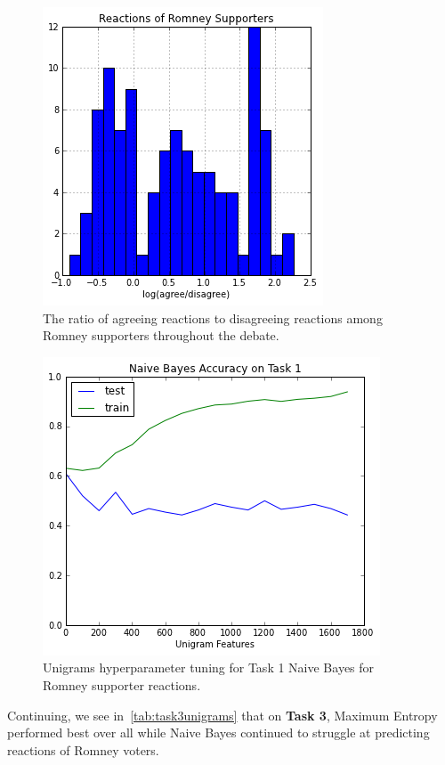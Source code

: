 \begin{figure}[]
	\centering
	\includegraphics[scale=0.60]{Figures/ngrams_balance_rom.png}
	\caption{The ratio of agreeing reactions to disagreeing reactions among Romney supporters throughout the debate.}
	\label{fig:ngramsbalancerom}
\end{figure}

\begin{figure}[]
	\centering
	\includegraphics[scale=0.60]{Figures/ngrams_hyperparam_task2_rom.png}
	\caption{Unigrams hyperparameter tuning for Task 1 Naive Bayes for Romney supporter reactions.}
	\label{fig:ngramstask2hyperparamrom}
\end{figure}

Continuing, we see in~\ref{tab:task3unigrams} that on \textbf{Task 3}, Maximum Entropy performed best over all while Naive Bayes continued to struggle at predicting reactions of Romney voters.

